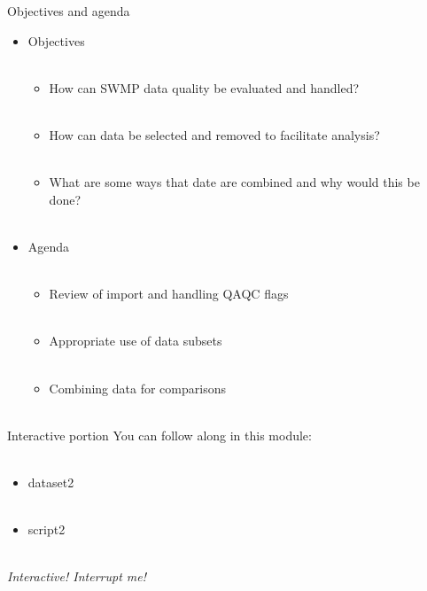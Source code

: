 \documentclass[xcolor=svgnames]{beamer}\usepackage[]{graphicx}\usepackage[]{color}
\begin{document}
\begin{frame}{Objectives and agenda}
\begin{itemize}
\onslide<+->
\item Objectives \\~\\
\begin{itemize}
\item How can SWMP data quality be evaluated and handled? \\~\\
\item How can data be selected and removed to facilitate analysis? \\~\\
\item What are some ways that date are combined and why would this be done? \\~\\
\end{itemize}
\onslide<+->
\item Agenda \\~\\
\begin{itemize}
\item Review of import and handling QAQC flags\\~\\
\item Appropriate use of data subsets \\~\\
\item Combining data for comparisons \\~\\
\end{itemize}
\end{itemize}
\end{frame}

\begin{frame}{Interactive portion}
You can follow along in this module: \\~\\
\begin{itemize}
\item dataset2 \\~\\
\item script2 \\~\\
\end{itemize}
\Large
\centerline{\emph{Interactive! Interrupt me!}}
\end{frame}
\end{document}

